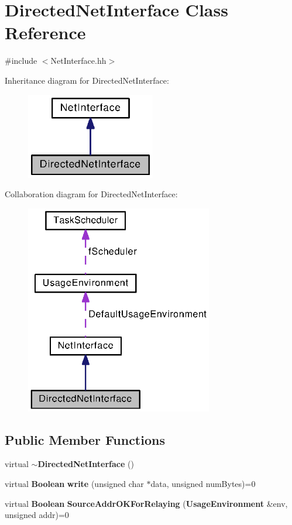 \section{Directed\+Net\+Interface Class Reference}
\label{classDirectedNetInterface}


{\ttfamily \#include $<$Net\+Interface.\+hh$>$}



Inheritance diagram for Directed\+Net\+Interface\+:
\nopagebreak
\begin{figure}[H]
\begin{center}
\leavevmode
\includegraphics[width=160pt]{classDirectedNetInterface__inherit__graph}
\end{center}
\end{figure}


Collaboration diagram for Directed\+Net\+Interface\+:
\nopagebreak
\begin{figure}[H]
\begin{center}
\leavevmode
\includegraphics[width=232pt]{classDirectedNetInterface__coll__graph}
\end{center}
\end{figure}
\subsection*{Public Member Functions}
\begin{DoxyCompactItemize}
\item 
virtual {\bf $\sim$\+Directed\+Net\+Interface} ()
\item 
virtual {\bf Boolean} {\bf write} (unsigned char $\ast$data, unsigned num\+Bytes)=0
\item 
virtual {\bf Boolean} {\bf Source\+Addr\+O\+K\+For\+Relaying} ({\bf Usage\+Environment} \&env, unsigned addr)=0
\end{DoxyCompactItemize}
